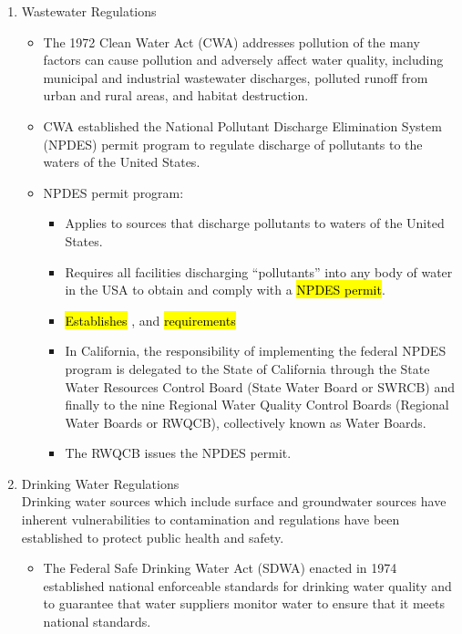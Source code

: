 \documentclass{article}
\begin{document}
\begin{enumerate}
\item Wastewater Regulations

\begin{itemize}
\item The 1972 Clean Water Act (CWA) addresses pollution of the many factors can cause pollution and adversely affect water quality, including municipal and industrial wastewater discharges, polluted runoff from urban and rural areas, and habitat destruction.\\
\item CWA established the National Pollutant Discharge Elimination System (NPDES) permit program to regulate discharge of pollutants to the waters of the United States.\\
\item NPDES permit program:
\begin{itemize}
\item Applies to sources that discharge pollutants to waters of the United States.
\item Requires all facilities discharging “pollutants” into any body of water in the USA to obtain and comply with a \hl{NPDES permit}.
\item \hl{Establishes} ,  and  \hl{requirements}\\
\item In California, the responsibility of implementing the federal NPDES program is delegated to the State of California through the State Water Resources Control Board (State Water Board or SWRCB) and finally to the nine Regional Water Quality Control Boards (Regional Water Boards or RWQCB), collectively known as Water Boards. 
\item The RWQCB issues the NPDES permit.
\end{itemize}
\end{itemize}


\item Drinking Water Regulations\\
Drinking water sources which include surface and groundwater sources have inherent vulnerabilities to contamination and regulations have been established to protect public health and safety.
\begin{itemize}
\item The Federal Safe Drinking Water Act (SDWA) enacted in 1974 established national enforceable standards for drinking water quality and to guarantee that water suppliers monitor water to ensure that it meets national standards. \\


\end{itemize}
\end{enumerate}
\end{document}
